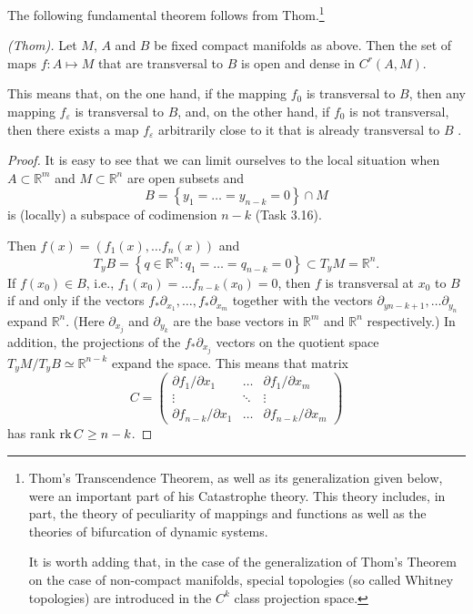 The following fundamental theorem follows from Thom.\footnote{Thom's Transcendence Theorem, as well as its generalization given below, were an important part of his Catastrophe theory. This theory includes, in part, the theory of peculiarity of mappings and functions as well as the theories of bifurcation of dynamic systems.

It is worth adding that, in the case of the generalization of Thom's Theorem on the case of non-compact manifolds, special topologies (so called Whitney topologies) are introduced in the $C^k$ class projection space.}

\begin{theorem}\emph{(Thom).}\label{theo:3.6}
	Let $M$, $A$ and $B$ be fixed compact manifolds as above. Then the set of maps $f:A\longmapsto M$ that are transversal to $B$ is open and dense in $C^r (A,M)$.
	
	This means that, on the one hand, if the mapping $f_0$ is transversal to $B$, then any mapping $f_{\varepsilon}$ is transversal to $B$, and, on the other hand, if $f_0$ is not transversal,  then there exists a map $f_{\varepsilon}$ arbitrarily close to it that is already transversal to $B$ .
	
	\begin{proof}
		It is easy to see that we can limit ourselves to the local situation when $A\subset \mathbb{R}^{m}$ and $M\subset \mathbb{R}^{n}$ are open subsets and
		$$
		B=\left\{ y_{1}=\ldots =y_{n-k}=0\right\} \cap M
		$$
		is (locally) a subspace of codimension $n-k$ (Task 3.16).
		
		Then $f(x)=\left( f_{1}(x),\ldots f_{n}(x)\right) $ and
		$$
		T_{y}B=\left\{ q\in \mathbb{R}^{n}:q_{1}=\ldots =q_{n-k}=0\right\} \subset
		T_{y}M=\mathbb{R}^{n}.
		$$
		If $f(x_{0})\in B$, i.e., $f_{1}(x_{0})=\ldots f_{n-k}(x_{0})=0$, then $f$ is transversal at $x_0$ to $B$ if and only if the vectors $f_{\ast }\partial _{x_{1}},\ldots ,f_{\ast }\partial _{x_{m}}$ together with the vectors $\partial _{yn-k+1},\ldots \partial _{y_{n}}$ expand $\mathbb{R}^{n}$. (Here $\partial _{x_{j}}$ and $\partial _{y_{k}}$ are the base vectors in $\mathbb{R}^{m}$ and $\mathbb{R}^{n}$ respectively.) In addition, the projections of the $f_{\ast }\partial _{x_{j}}$ vectors on the quotient space $T_{y}M/T_{y}B\simeq \mathbb{R}^{n-k}$ expand the space. This means that matrix$$
		C=
		\begin{pmatrix}
		\partial f_{1}/\partial x_{1} & \ldots  & \partial f_{1}/\partial x_{m} \\
		\vdots  & \ddots  & \vdots  \\
		\partial f_{n-k}/\partial x_{1} & \ldots  & \partial f_{n-k}/\partial x_{m}%
		\end{pmatrix}
		$$
		has rank $\textrm{rk\,}C\geq n-k$.
		

\end{proof}
\end{theorem}
